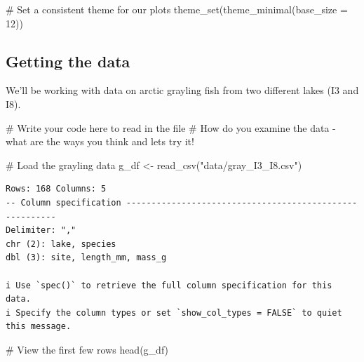 \documentclass[
]{article}
\newenvironment{Shaded}{}{}
\newcommand{\AttributeTok}[1]{\textcolor[rgb]{0.84,0.23,0.29}{#1}}
\newcommand{\CommentTok}[1]{\textcolor[rgb]{0.42,0.45,0.49}{#1}}
\newcommand{\DecValTok}[1]{\textcolor[rgb]{0.00,0.36,0.77}{#1}}
\newcommand{\FunctionTok}[1]{\textcolor[rgb]{0.44,0.26,0.76}{#1}}
\newcommand{\NormalTok}[1]{\textcolor[rgb]{0.14,0.16,0.18}{#1}}
\newcommand{\OtherTok}[1]{\textcolor[rgb]{0.44,0.26,0.76}{#1}}
\newcommand{\StringTok}[1]{\textcolor[rgb]{0.01,0.18,0.38}{#1}}
\begin{document}
\begin{Shaded}
\begin{Highlighting}[]
\CommentTok{\# Set a consistent theme for our plots}
\FunctionTok{theme\_set}\NormalTok{(}\FunctionTok{theme\_minimal}\NormalTok{(}\AttributeTok{base\_size =} \DecValTok{12}\NormalTok{))}
\end{Highlighting}
\end{Shaded}

\subsection{Getting the data}\label{getting-the-data}

\begin{tcolorbox}[enhanced jigsaw, opacitybacktitle=0.6, breakable, colbacktitle=quarto-callout-tip-color!10!white, toptitle=1mm, arc=.35mm, titlerule=0mm, title=\textcolor{quarto-callout-tip-color}{\faLightbulb}\hspace{0.5em}{Practice Exercise 1: Loading and Examining the Grayling Data}, coltitle=black, bottomrule=.15mm, rightrule=.15mm, colframe=quarto-callout-tip-color-frame, bottomtitle=1mm, toprule=.15mm, leftrule=.75mm, opacityback=0, left=2mm, colback=white]

We'll be working with data on arctic grayling fish from two different
lakes (I3 and I8).

\begin{Shaded}
\begin{Highlighting}[]
\CommentTok{\# Write your code here to read in the file}
\CommentTok{\# How do you examine the data {-} what are the ways you think and lets try it!}

\CommentTok{\# Load the grayling data}
\NormalTok{g\_df }\OtherTok{\textless{}{-}} \FunctionTok{read\_csv}\NormalTok{(}\StringTok{"data/gray\_I3\_I8.csv"}\NormalTok{)}
\end{Highlighting}
\end{Shaded}

\begin{verbatim}
Rows: 168 Columns: 5
-- Column specification --------------------------------------------------------
Delimiter: ","
chr (2): lake, species
dbl (3): site, length_mm, mass_g

i Use `spec()` to retrieve the full column specification for this data.
i Specify the column types or set `show_col_types = FALSE` to quiet this message.
\end{verbatim}

\begin{Shaded}
\begin{Highlighting}[]
\CommentTok{\# View the first few rows}
\FunctionTok{head}\NormalTok{(g\_df)}
\end{Highlighting}
\end{Shaded}


\end{tcolorbox}
\end{document}

